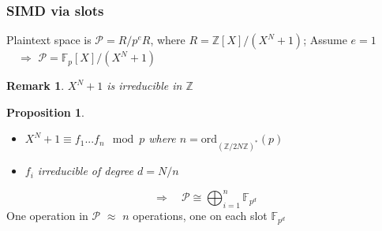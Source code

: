 \documentclass{beamer}
\newcommand{\Z}{\mathbb{Z}}
\newcommand{\F}{\mathbb{F}}
\newtheorem{remark}{Remark}
\newtheorem{prop}{Proposition}
\begin{document}
\begin{frame}
    \frametitle{SIMD via slots}

    Plaintext space is $\mathcal{P} = R/p^eR$, where $R = \Z[X]/(X^N + 1)$; Assume $e = 1$
    \\$\quad \Rightarrow$ $\mathcal{P} = \F_p[X]/(X^N + 1)$
    \begin{remark}
        $X^N + 1$ is irreducible in $\Z$
    \end{remark}
    \begin{prop}
        \begin{itemize}
            \item $X^N + 1 \equiv f_1 ... f_n \mod p$ where $n = \mathrm{ord}_{(\Z/2N\Z)^*}(p)$
            \item $f_i$ irreducible of degree $d = N/n$
        \end{itemize}
    \end{prop}
    \begin{equation*}
        \Rightarrow \quad \mathcal{P} \cong \bigoplus_{i = 1}^n \F_{p^d}
    \end{equation*}
    One operation in $\mathcal{P}$ $\approx$ $n$ operations, one on each slot $\F_{p^d}$
\end{frame}
\end{document}
